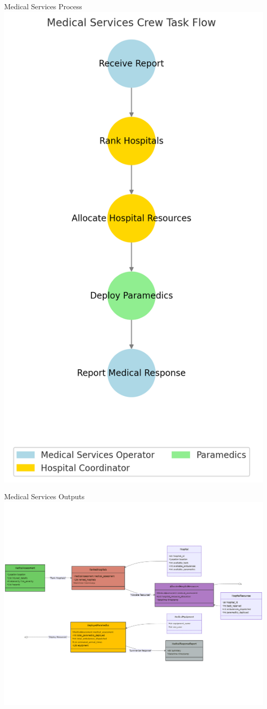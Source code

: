 \begin{frame}{Medical Services Process}
    \centering
    \includegraphics[height=\textheight]{figures/Medical_Services_Crew_Flow.png} 
\end{frame}

\begin{frame}{Medical Services Outputs}
    \centering
    \includegraphics[width=\textwidth]{figures/MedicalServices_ClassDiagram.png}
\end{frame}